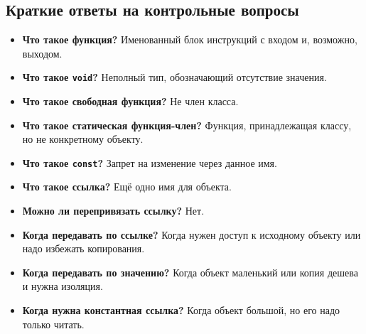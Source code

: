 \subsection{Краткие ответы на контрольные вопросы}
\begin{itemize}
    \item \textbf{Что такое функция?} Именованный блок инструкций с входом и, возможно, выходом.
    \item \textbf{Что такое \texttt{void}?} Неполный тип, обозначающий отсутствие значения.
    \item \textbf{Что такое свободная функция?} Не член класса.
    \item \textbf{Что такое статическая функция-член?} Функция, принадлежащая классу, но не конкретному объекту.
    \item \textbf{Что такое \texttt{const}?} Запрет на изменение через данное имя.
    \item \textbf{Что такое ссылка?} Ещё одно имя для объекта.
    \item \textbf{Можно ли перепривязать ссылку?} Нет.
    \item \textbf{Когда передавать по ссылке?} Когда нужен доступ к исходному объекту или надо избежать копирования.
    \item \textbf{Когда передавать по значению?} Когда объект маленький или копия дешева и нужна изоляция.
    \item \textbf{Когда нужна константная ссылка?} Когда объект большой, но его надо только читать.
\end{itemize}

